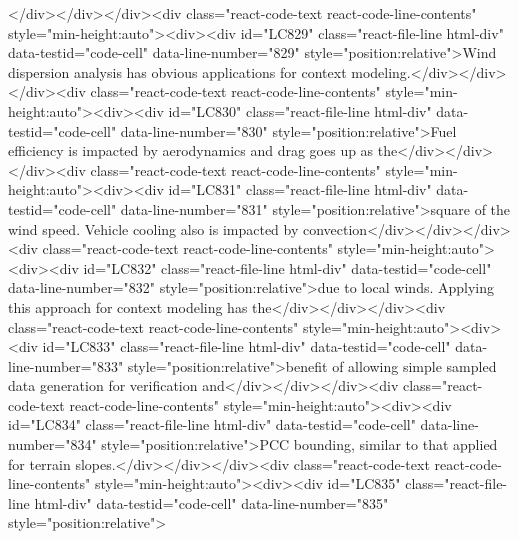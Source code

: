 {{{{{</div></div></div><div class="react-code-text react-code-line-contents" style="min-height:auto"><div><div id="LC829" class="react-file-line html-div" data-testid="code-cell" data-line-number="829" style="position:relative">Wind dispersion analysis has obvious applications for context modeling.</div></div></div><div class="react-code-text react-code-line-contents" style="min-height:auto"><div><div id="LC830" class="react-file-line html-div" data-testid="code-cell" data-line-number="830" style="position:relative">Fuel efficiency is impacted by aerodynamics and drag goes up as the</div></div></div><div class="react-code-text react-code-line-contents" style="min-height:auto"><div><div id="LC831" class="react-file-line html-div" data-testid="code-cell" data-line-number="831" style="position:relative">square of the wind speed. Vehicle cooling also is impacted by convection</div></div></div><div class="react-code-text react-code-line-contents" style="min-height:auto"><div><div id="LC832" class="react-file-line html-div" data-testid="code-cell" data-line-number="832" style="position:relative">due to local winds. Applying this approach for context modeling has the</div></div></div><div class="react-code-text react-code-line-contents" style="min-height:auto"><div><div id="LC833" class="react-file-line html-div" data-testid="code-cell" data-line-number="833" style="position:relative">benefit of allowing simple sampled data generation for verification and</div></div></div><div class="react-code-text react-code-line-contents" style="min-height:auto"><div><div id="LC834" class="react-file-line html-div" data-testid="code-cell" data-line-number="834" style="position:relative">PCC bounding, similar to that applied for terrain slopes.</div></div></div><div class="react-code-text react-code-line-contents" style="min-height:auto"><div><div id="LC835" class="react-file-line html-div" data-testid="code-cell" data-line-number="835" style="position:relative">
}}}}}
